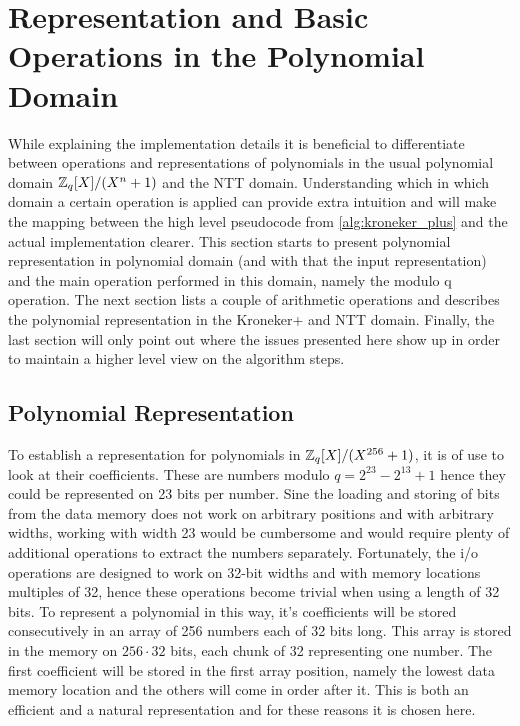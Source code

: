 \section{Representation and Basic Operations in the Polynomial Domain}

While explaining the implementation details it is beneficial to differentiate between operations and representations of polynomials in the usual polynomial domain $\mathbb{Z}_q[X]/(X^n + 1)$ and the NTT domain. Understanding which in which domain a certain operation is applied can provide extra intuition and will make the mapping between the high level pseudocode from \cref{alg:kroneker_plus} and the actual implementation clearer. This section starts to present polynomial representation in polynomial domain (and with that the input representation) and the main operation performed in this domain, namely the modulo q operation. The next section lists a couple of arithmetic operations and describes the polynomial representation in the Kroneker+ and NTT domain. Finally, the last section will only point out where the issues presented here show up in order to maintain a higher level view on the algorithm steps.

\subsection{Polynomial Representation}

To establish a representation for polynomials in $\mathbb{Z}_q[X]/(X^{256} + 1)$, it is of use to look at their coefficients. These are numbers modulo $q = 2^{23} - 2^{13} + 1$ hence they could be represented on 23 bits per number. Sine the loading and storing of bits from the data memory does not work on arbitrary positions and with arbitrary widths, working with width 23 would be cumbersome and would require plenty of additional operations to extract the numbers separately. Fortunately, the i/o operations are designed to work on 32-bit widths and with memory locations multiples of 32, hence these operations become trivial when using a length of 32 bits. To represent a polynomial in this way, it's coefficients will be stored consecutively in an array of 256 numbers each of 32 bits long. This array is stored in the memory on $256 \cdot 32$ bits, each chunk of 32 representing one number. The first coefficient will be stored in the first array position, namely the lowest data memory location and the others will come in order after it. This is both an efficient and a natural representation and for these reasons it is chosen here.

